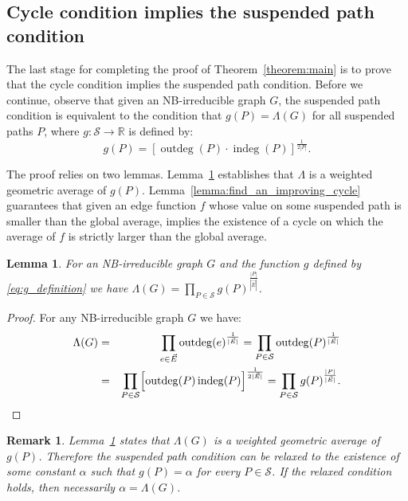 \documentclass{article}
\newtheorem{lemma}[theorem]{Lemma}
\newtheorem{remark}[theorem]{Remark}
\newcommand{\dirE}{\vec{E}}
\newcommand{\R}{\mathbb{R}}  %
\DeclareMathOperator{\outdeg}{outdeg}
\DeclareMathOperator{\indeg}{indeg}
\begin{document}
\subsection{Cycle condition implies the suspended path condition}\label{subsect:cycle_implies_suspended}

The last stage for completing the proof of Theorem~\ref{theorem:main}
is to prove that the cycle condition implies the suspended path condition.
Before we continue, observe that given an NB-irreducible graph $G$, the suspended path condition is equivalent to the condition 
that $g(P) = \Lambda(G)$ for all suspended paths $P$,
where $g:\mathcal{S}\to\R$ is defined by:
\begin{equation}\label{eq:g_definition}
    g(P) = \left[\outdeg(P) \cdot \indeg(P)\right]^\frac{1}{2|P|}.
\end{equation}

The proof relies on two lemmas. Lemma~\ref{lemma:geometric_mean_of_g_is_Lambda} establishes that $\Lambda$ is a weighted geometric average of $g(P)$.  Lemma~\ref{lemma:find_an_improving_cycle} guarantees that given an edge function $f$ whose value on some suspended path is smaller than the global average, 
implies the existence of a cycle on which the average of $f$ is strictly larger than the global average.

\begin{lemma}\label{lemma:geometric_mean_of_g_is_Lambda}
    For an NB-irreducible graph $G$ and the function $g$ defined by \eqref{eq:g_definition}
    we have $\Lambda(G) = \prod_{P \in \mathcal {S}} {g(P)} ^ \frac{|P|}{|\dirE|}$. 
\end{lemma}

\begin{proof}
    For any NB-irreducible graph $G$ we have:
    \begin{eqnarray*}
        \Lambda(G) 
            &=& \prod_{e \in \dirE} {\outdeg(e)}^\frac{1}{|\dirE|}
             =  \prod_{P \in \mathcal {S}} {\outdeg(P)}^\frac{1}{|\dirE|}\\
            &=& \prod_{P \in \mathcal {S}} \Bigl[ \outdeg(P)\indeg(P) \Bigr] ^ \frac{1}{2|\dirE|}
             =  \prod_{P \in \mathcal {S}} {g(P)} ^ \frac{|P|}{|\dirE|}. 
    \end{eqnarray*}
\end{proof}

\begin{remark}\label{remark:realxedSuspended}
    Lemma~\ref{lemma:geometric_mean_of_g_is_Lambda} states that $\Lambda(G)$ 
    is a weighted geometric average of $g(P)$.
    Therefore the suspended path condition can be relaxed to the existence of some constant
    $\alpha$ such that $g(P)=\alpha$ for every $P\in \mathcal {S}$.
    If the relaxed condition holds, then necessarily $\alpha=\Lambda(G)$.
\end{remark}
\end{document}
